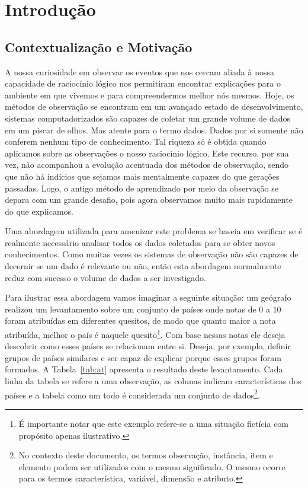 \chapter{Introdução}

\section{Contextualização e Motivação}

A nossa curiosidade em observar os eventos que nos cercam
aliada à nossa capacidade de raciocínio lógico nos
permitiram encontrar explicações para o ambiente em que
vivemos e para compreendermos melhor nós mesmos. Hoje, os
métodos de observação se encontram em um avançado estado de
desenvolvimento, sistemas computadorizados são capazes de
coletar um grande volume de dados em um piscar de
olhos. Mas atente para o termo dados. Dados por si somente
não conferem nenhum tipo de conhecimento. Tal riqueza só é
obtida quando aplicamos sobre as observações o nosso
raciocínio lógico.  Este recurso, por sua vez, não
acompanhou a evolução acentuada dos métodos de
observação, sendo que não há indícios que sejamos mais
mentalmente capazes do que gerações passadas. Logo, o antigo
método de aprendizado por meio da observação se depara com
um grande desafio, pois agora observamos muito mais
rapidamente do que explicamos.

Uma abordagem utilizada para amenizar este problema se
baseia em verificar se é realmente necessário analisar todos
os dados coletados para se obter novos conhecimentos. Como
muitas vezes os sistemas de observação não são capazes de
decernir se um dado é relevante ou não, então esta abordagem
normalmente reduz com sucesso o volume de dados a ser
investigado.  

Para ilustrar essa abordagem vamos imaginar a seguinte
situação: um geógrafo realizou um levantamento sobre um
conjunto de países onde notas de $0$ a $10$ foram atribuídas
em diferentes quesitos, de modo que quanto maior a nota
atribuída, melhor o país é naquele quesito\footnote{É
importante notar que este exemplo refere-se a uma
situação fictícia com propósito apenas ilustrativo.}. Com
base nessas notas ele deseja descobrir como esses países se
relacionam entre si. Deseja, por exemplo, definir grupos
de países similares e ser capaz de explicar porque esses
grupos foram formados. A Tabela~\ref{tab:at} apresenta o
resultado deste levantamento. Cada linha da tabela se
refere a uma observação, as colunas indicam características
dos países e a tabela como um todo é considerada um conjunto
de dados\footnote{No contexto deste documento, os termos
observação, instância, item e elemento podem ser
utilizados com o mesmo significado. O mesmo ocorre para
os termos característica, variável, dimensão e atributo.}.

